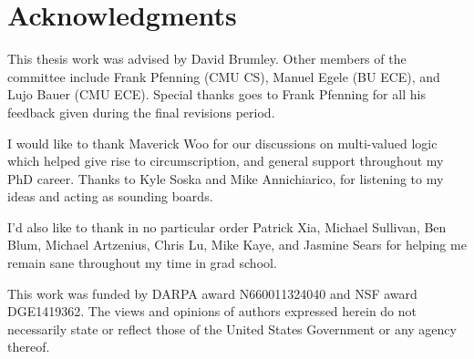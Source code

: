 \documentclass[12pt,final,oldfontcommands,oneside,letterpaper]{memoir}
\begin{document}
\frontmatter

\thetitlepage
\copyrightpage

\pagestyle{plain}
\section*{Acknowledgments}
\setcounter{page}{3}
This thesis work was advised by David Brumley.
Other members of the committee include Frank Pfenning (CMU CS), Manuel Egele (BU ECE), and Lujo Bauer (CMU ECE).
Special thanks goes to Frank Pfenning for all his feedback given during the final revisions period.

I would like to thank Maverick Woo for our discussions on multi-valued logic which helped give rise to circumscription, and general support throughout my PhD career.
Thanks to Kyle Soska and Mike Annichiarico, for listening to my ideas and acting as sounding boards.

I'd also like to thank in no particular order Patrick Xia, Michael Sullivan, Ben Blum, Michael Artzenius, Chris Lu, Mike Kaye, and Jasmine Sears for helping me remain sane throughout my time in grad school.

This work was funded by DARPA award N660011324040 and NSF award DGE1419362.
The views and opinions of authors expressed herein do not necessarily state or reflect those of the United States Government or any agency thereof.

\newpage

\pagestyle{plain}
\clearpage

\setcmuspacing
\begin{abstract}
        {}
\end{abstract}
\clearpage

\tableofcontents

\mainmatter








\backmatter
\renewcommand{\bibsection}{\chapter{\bibname}}


\end{document}
